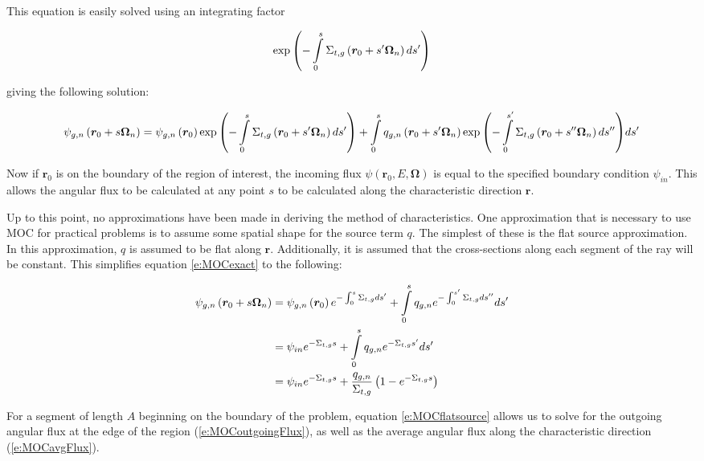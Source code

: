 This equation is easily solved using an integrating factor

\begin{equation}
\exp{\left(-\intop_0^s \Sigma_{t,g}\left(\bm r_0 + s'\bm\Omega_n\right)ds'\right)}
\end{equation}

giving the following solution:

\begin{dmath}\label{e:MOCexact}
{\psi_{g,n}\left(\bm r_0 + s\bm\Omega_n\right) = \psi_{g,n}\left(\bm r_0\right)\exp{\left(-\intop_0^s \Sigma_{t,g}\left(\bm r_0 + s'\bm\Omega_n\right)ds'\right)}} + {\intop_0^s q_{g,n}\left(\bm r_0 + s'\bm\Omega_n\right)\exp{\left(-\intop_0^{s'} \Sigma_{t,g}\left(\bm r_0 + s''\bm\Omega_n\right)ds''\right)}ds'}
\end{dmath}

Now if $\bm r_0$ is on the boundary of the region of interest, the incoming flux $\psi\left(\bm r_0,E,\bm \Omega\right)$ is equal to the specified boundary condition $\psi_{in}$.  This allows the angular flux to be calculated at any point $s$ to be calculated along the characteristic direction $\bm r$.

Up to this point, no approximations have been made in deriving the method of characteristics.  One approximation that is necessary to use MOC for practical problems is to assume some spatial shape for the source term $q$.  The simplest of these is the flat source approximation.  In this approximation, $q$ is assumed to be flat along $\bm r$.  Additionally, it is assumed that the cross-sections along each segment of the ray will be constant.  This simplifies equation \ref{e:MOCexact} to the following:

\begin{align}\label{e:MOCflatsource}
\psi_{g,n}\left(\bm r_0 + s\bm\Omega_n\right) &= \psi_{g,n}\left(\bm r_0\right)e^{-\intop_0^s \Sigma_{t,g} ds'} + \intop_0^s q_{g,n}e^{-\intop_0^{s'} \Sigma_{t,g}ds''}ds' \nonumber\\
 &= \psi_{in}e^{-\Sigma_{t,g} s} + \intop_0^s q_{g,n} e^{-\Sigma_{t,g} s'} ds' \nonumber \\
 &= \psi_{in}e^{-\Sigma_{t,g} s} + \frac{q_{g,n}}{\Sigma_{t,g}}\left(1 - e^{-\Sigma_{t,g}s}\right)
\end{align}

For a segment of length $A$ beginning on the boundary of the problem, equation \ref{e:MOCflatsource} allows us to solve for the outgoing angular flux at the edge of the region (\ref{e:MOCoutgoingFlux}), as well as the average angular flux along the characteristic direction (\ref{e:MOCavgFlux}).

